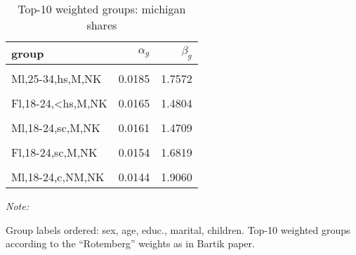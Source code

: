 \begin{table}

\caption{\label{tab:rotweights:michigan}Top-10 weighted groups: michigan shares}
\centering
\begin{threeparttable}
\begin{tabular}[t]{lrr}
\toprule
group & $\alpha_g$ & $\beta_g$\\
\midrule
\cellcolor{gray!6}{Ml,18-24,hs,M,NK} & \cellcolor{gray!6}{0.0346} & \cellcolor{gray!6}{1.5546}\\
\addlinespace
Ml,25-34,hs,M,NK & 0.0185 & 1.7572\\
\addlinespace
\cellcolor{gray!6}{Ml,18-24,c,M,NK} & \cellcolor{gray!6}{0.0181} & \cellcolor{gray!6}{1.5877}\\
\addlinespace
Fl,18-24,<hs,M,NK & 0.0165 & 1.4804\\
\addlinespace
\cellcolor{gray!6}{Fl,18-24,hs,M,NK} & \cellcolor{gray!6}{0.0164} & \cellcolor{gray!6}{1.6229}\\
\addlinespace
Ml,18-24,sc,M,NK & 0.0161 & 1.4709\\
\addlinespace
\cellcolor{gray!6}{Ml,18-24,hs,M,K} & \cellcolor{gray!6}{0.0154} & \cellcolor{gray!6}{1.6510}\\
\addlinespace
Fl,18-24,sc,M,NK & 0.0154 & 1.6819\\
\addlinespace
\cellcolor{gray!6}{Ml,35-49,sc,M,NK} & \cellcolor{gray!6}{0.0152} & \cellcolor{gray!6}{1.4304}\\
\addlinespace
Ml,18-24,c,NM,NK & 0.0144 & 1.9060\\
\bottomrule
\end{tabular}
\begin{tablenotes}
\item \textit{Note: } 
\item Group labels ordered: sex, age, educ., marital, children. Top-10 weighted groups according to the ``Rotemberg'' weights as in Bartik paper.
\end{tablenotes}
\end{threeparttable}
\end{table}
